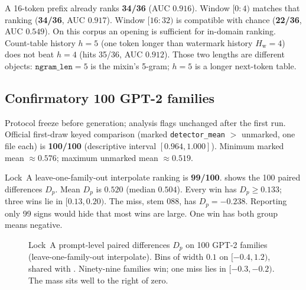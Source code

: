 \documentclass[11pt,a4paper]{article}
\theoremstyle{definition}
\newcommand{\Hw}{H_{\mathrm{w}}}
\newcommand{\hist}{h}
\begin{document}
A 16-token prefix already ranks \textbf{34/36} (AUC $0.916$). Window
$[0{:}4)$ matches that ranking (\textbf{34/36}, AUC $0.917$). Window
$[16{:}32)$ is compatible with chance (\textbf{22/36}, AUC $0.549$). On this corpus
an opening is sufficient for in-domain ranking. Count-table history
$\hist=5$ (one token longer than watermark history $\Hw=4$) does not
beat $\hist=4$ (hits 35/36, AUC $0.912$). Those two lengths are
different objects: $\mathtt{ngram\_len}=5$ is the mixin's 5-gram;
$\hist=5$ is a longer next-token table.

\subsection{Confirmatory 100 GPT-2 families}
\label{sec:lock}

Protocol freeze before generation; analysis flags unchanged after the
first run. Official first-draw keyed comparison (marked
\texttt{detector\_mean} $>$ unmarked, one file each) is
\textbf{100/100} (descriptive interval $[0.964,1.000]$). Minimum marked
mean $\approx 0.576$; maximum unmarked mean $\approx 0.519$.

Lock~A leave-one-family-out interpolate ranking is \textbf{99/100}.
 shows the 100 paired differences $D_p$. Mean $D_p$ is
$0.520$ (median $0.504$). Every win has $D_p\ge 0.133$; three wins lie
in $[0.13,0.20)$. The miss, stem 088, has $D_p=-0.238$. Reporting only
99 signs would hide that most wins are large. One win has both group
means negative.

\begin{figure}[ht]
\centering
{}
\caption{Lock~A prompt-level paired differences $D_p$ on 100 GPT-2
families (leave-one-family-out interpolate). Bins of width $0.1$ on
$[-0.4,1.2)$, shared with .
Ninety-nine families win; one miss lies in $[-0.3,-0.2)$. The mass sits
well to the right of zero.}
\label{fig:locka}
\end{figure}
\end{document}
